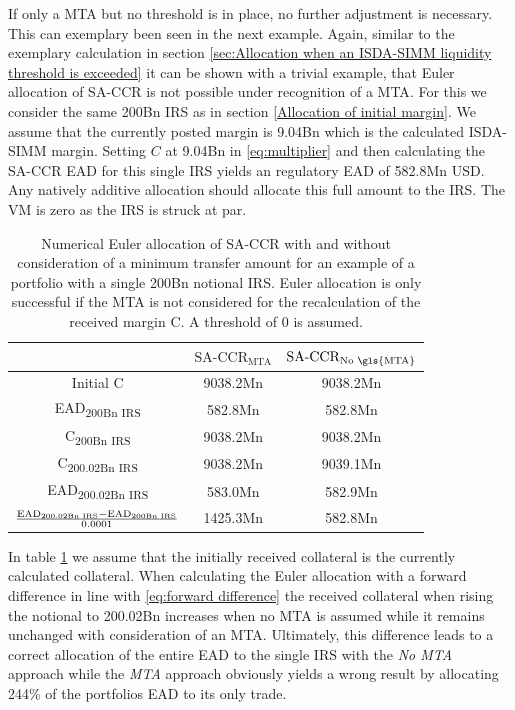 \documentclass[../Thesis_AHoecherl.tex]{subfiles}
\begin{document}
    If only a MTA but no threshold is in place, no further adjustment is necessary.
    This can exemplary been seen in the next example.
    Again, similar to the exemplary calculation in section \ref{sec:Allocation when an ISDA-SIMM liquidity threshold is exceeded} it can be shown with a trivial example, that Euler allocation of SA-CCR is not possible under recognition of a \gls{MTA}. 
    For this we consider the same 200Bn \gls{IRS} as in section \ref{Allocation of initial margin}. We assume that the currently posted margin is 9.04Bn which is the calculated ISDA-SIMM margin. 
    Setting $C$ at 9.04Bn in \ref{eq:multiplier} and then calculating the SA-CCR EAD for this single IRS  yields an regulatory EAD of 582.8Mn USD. Any natively additive allocation should allocate this full amount to the IRS.
    The \gls{VM} is zero as the IRS is struck at par.
    \begin{table}[htbp]
        \label{tab:Allocate SA-CCR with MTA calculation}
        \centering
            \begin{tabular}{c|c|c}
                & $\text{SA-CCR}_{\text{MTA}}$ & $\text{SA-CCR}_{\text{No \gls{MTA}}}$ \\
                \toprule
                Initial C & 9038.2Mn & 9038.2Mn \\
                \midrule
                EAD\textsubscript{200Bn IRS} & 582.8Mn & 582.8Mn \\
                \midrule
                C\textsubscript{200Bn IRS} & 9038.2Mn & 9038.2Mn \\
                \midrule
                C\textsubscript{200.02Bn IRS} & 9038.2Mn & 9039.1Mn \\
                \midrule
                EAD\textsubscript{200.02Bn IRS} & 583.0Mn & 582.9Mn \\
                \midrule
                $\frac{\text{EAD\textsubscript{200.02Bn IRS}}-\text{EAD\textsubscript{200Bn IRS}}}{0.0001}$ & 1425.3Mn & 582.8Mn  \\
            \end{tabular}%
        \caption{Numerical Euler allocation of SA-CCR with and without consideration of a minimum transfer amount for an example of a portfolio with a single 200Bn notional IRS. Euler allocation is only successful if the \gls{MTA} is not considered for the recalculation of the received margin C. A threshold of 0 is assumed.}
    \end{table}
    In table \ref{tab:Allocate SA-CCR with MTA calculation} we assume that the initially received collateral is the currently calculated collateral. 
    When calculating the Euler allocation with a forward difference in line with \ref{eq:forward difference} the received collateral when rising the notional to 200.02Bn increases when no MTA is assumed while it remains unchanged with consideration of an MTA. 
    Ultimately, this difference leads to a correct allocation of the entire EAD to the single IRS with the \emph{No MTA} approach while the \emph{MTA} approach obviously yields a wrong result by allocating 244\% of the portfolios EAD to its only trade.
\end{document}
